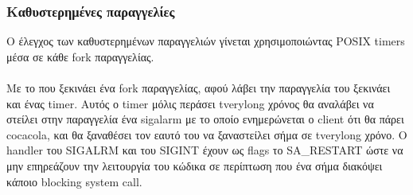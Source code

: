 \documentclass{article}
\begin{document}
\subsubsection{Καθυστερημένες παραγγελίες}
\label{late}
Ο έλεγχος των καθυστερημένων παραγγελιών γίνεται χρησιμοποιώντας POSIX timers μέσα σε κάθε fork παραγγελίας.
\paragraph{}
Με το που ξεκινάει ένα fork παραγγελίας, αφού λάβει την παραγγελία του ξεκινάει και ένας timer. Αυτός ο timer μόλις περάσει tverylong χρόνος θα αναλάβει να στείλει στην παραγγελία ένα sigalarm με το οποίο ενημερώνεται ο client ότι θα πάρει cocacola, και θα ξαναθέσει τον εαυτό του να ξαναστείλει σήμα σε tverylong χρόνο. Ο handler του SIGALRM και του SIGINT έχουν ως flags το SA\_RESTART ώστε να μην επηρεάζουν την λειτουργία του κώδικα σε περίπτωση που ένα σήμα διακόψει κάποιο blocking system call.
\end{document}
